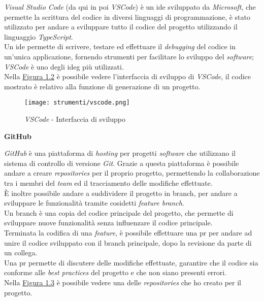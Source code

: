 \noindent \textit{Visual Studio Code} (da qui in poi \textit{VSCode}) è un \gls{ide} sviluppato da \textit{Microsoft}, che permette la scrittura del codice in diversi linguaggi di programmazione, è stato utilizzato per andare
a sviluppare tutto il codice del progetto utilizzando il linguaggio \textit{TypeScript}.\\
Un \gls{ide} permette di scrivere, testare ed effettuare il \textit{debugging} del codice in un'unica applicazione, fornendo strumenti per facilitare lo sviluppo del \textit{software}; \textit{VSCode} è uno degli \gls{ideg} più utilizzati.\\
Nella {\hyperref[fig:vscode]{Figura 1.2}} è possibile vedere l'interfaccia di sviluppo di \textit{VSCode}, il codice mostrato è relativo alla funzione di generazione di un progetto.

\begin{figure}[H]
    \label{fig:vscode}
    \centering
    \texttt{[image: strumenti/vscode.png]}
    \caption{\textit{VSCode} - Interfaccia di sviluppo}
\end{figure}

\noindent \textbf{GitHub\\}

\noindent \textit{GitHub} è una piattaforma di \textit{hosting} per progetti \textit{software} che utilizzano il sistema di controllo di versione \textit{Git}.
Grazie a questa piattaforma è possibile andare a creare \textit{repositories} per il proprio progetto, permettendo la collaborazione tra i membri del \textit{team} ed il tracciamento delle modifiche effettuate. \\
È inoltre possibile andare a suddividere il progetto in \gls{branch}, per andare a sviluppare le funzionalità tramite cosidetti \textit{feature branch}.\\
Un \gls{branch} è una copia del codice principale del progetto, che permette di sviluppare nuove funzionalità senza influenzare il codice principale.\\
Terminata la codifica di una \textit{feature}, è possibile effettuare una \gls{pr} per andare ad unire il codice sviluppato con il \gls{branch} principale, dopo la revisione da parte di un collega.\\
Una \gls{pr} permette di discutere delle modifiche effettuate, garantire che il codice sia conforme alle \textit{best practices} del progetto e che non siano presenti errori.\\
Nella {\hyperref[fig:github]{Figura 1.3}} è possibile vedere una delle \textit{repositories} che ho creato per il progetto.

